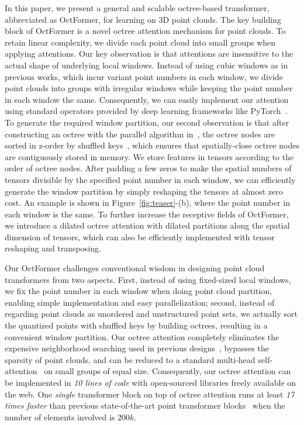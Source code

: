 \documentclass[acmtog,screen,authorversion]{acmart}
\begin{document}
In this paper, we present a general and scalable octree-based transformer, abbreviated as OctFormer, for learning on 3D point clouds.
The key building block of OctFormer is a novel octree attention mechanism for point clouds.
To retain linear complexity, we divide each point cloud into small groups when applying attentions.
Our key observation is that attentions are insensitive to the actual shape of underlying local windows.
Instead of using cubic windows as in previous works, which incur variant point numbers in each window, we divide point clouds into groups with irregular windows while keeping the point number in each window the same.
Consequently, we can easily implement our attention using standard operators provided by deep learning frameworks like PyTorch~\cite{Paszke2019}.
To generate the required window partition, our second observation is that after constructing an octree with the parallel algorithm in~\cite{Zhou2011}, the octree nodes are sorted in z-order by shuffled keys~\cite{Wilhelms1992}, which ensures that spatially-close octree nodes are contiguously stored in memory.
We store features in tensors according to the order of octree nodes.
After padding a few zeros to make the spatial numbers of tensors divisible by the specified point number in each window, we can efficiently generate the window partition by simply reshaping the tensors at almost zero cost.
An example is shown in Figure~\ref{fig:teaser}-(b), where the point number in each window is the same.
To further increase the receptive fields of OctFormer, we introduce a dilated octree attention with dilated partitions along the spatial dimension of tensors, which can also be efficiently implemented with tensor reshaping and transposing.


Our OctFormer challenges conventional wisdom in designing point cloud transformers from two aspects. 
First, instead of using fixed-sized local windows, we fix the point number in each window when doing point cloud partition, enabling simple implementation and easy parallelization; 
second, instead of regarding point clouds as unordered and unstructured point sets, we actually sort the quantized points with shuffled keys by building octrees, resulting in a convenient window partition.
Our octree attention completely eliminates the expensive neighborhood searching used in previous designs~\cite{Wu2022,Lai2022}, bypasses the sparsity of point clouds, and can be reduced to a standard multi-head self-attention~\cite{Vaswani2017} on small groups of equal size. 
Consequently, our octree attention can be implemented in \emph{10 lines of code} with open-sourced libraries freely available on the web. 
One \emph{single} transformer block on top of octree attention runs at least \emph{17 times faster} than previous state-of-the-art point transformer blocks~\cite{Lai2022,Wu2022} when the number of elements involved is $200k$.
\end{document}
